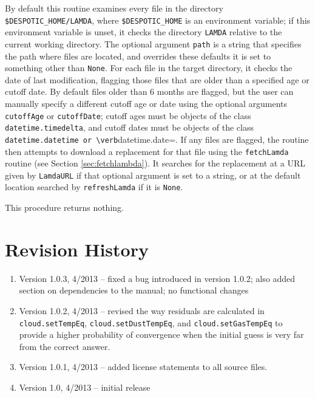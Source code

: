 \documentclass[12pt]{article}
\begin{document}
By default this routine examines every file in the directory \verb=$DESPOTIC_HOME/LAMDA=, where \verb=$DESPOTIC_HOME= is an environment variable; if this environment variable is unset, it checks the directory \verb=LAMDA= relative to the current working directory. The optional argument \verb=path= is a string that specifies the path where files are located, and overrides these defaults it is set to something other than \verb=None=. For each file in the target directory, it checks the date of last modification, flagging those files that are older than a specified age or cutoff date. By default files older than 6 months are flagged, but the user can manually specify a different cutoff age or date using the optional arguments \verb=cutoffAge= or \verb=cutoffDate=; cutoff ages must be objects of the class \verb=datetime.timedelta=, and cutoff dates must be objects of the class \verb=datetime.datetime or \verb=datetime.date=. If any files are flagged, the routine then attempts to download a replacement for that file using the \verb=fetchLamda= routine (see Section \ref{sec:fetchlambda}). It searches for the replacement at a URL given by \verb=LamdaURL= if that optional argument is set to a string, or at the default location searched by \verb=refreshLamda= if it is \verb=None=.

This procedure returns nothing.

\clearpage

\section{Revision History}

\begin{enumerate}
\item Version 1.0.3, 4/2013 -- fixed a bug introduced in version 1.0.2; also added section on dependencies to the manual; no functional changes
\item Version 1.0.2, 4/2013 -- revised the way residuals are calculated in \verb=cloud.setTempEq=, \verb=cloud.setDustTempEq=, and \verb=cloud.setGasTempEq= to provide a higher probability of convergence when the initial guess is very far from the correct answer.
\item Version 1.0.1, 4/2013 -- added license statements to all source files.
\item Version 1.0, 4/2013 -- initial release
\end{enumerate}
\end{document}
